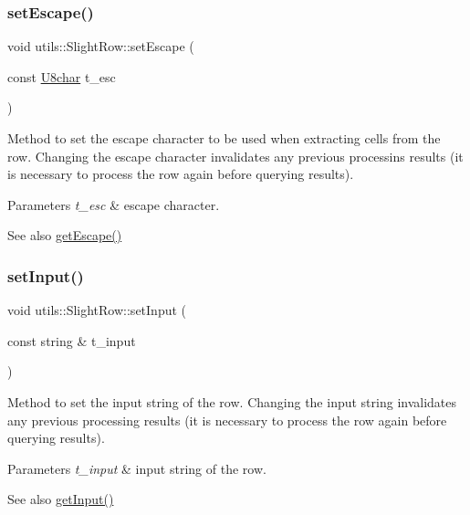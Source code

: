 \subsubsection{\texorpdfstring{set\+Escape()}{setEscape()}}
{\footnotesize\ttfamily void utils\+::\+Slight\+Row\+::set\+Escape (\begin{DoxyParamCaption}\item[{const \hyperlink{classutils_1_1U8char}{U8char}}]{t\+\_\+esc }\end{DoxyParamCaption})}

Method to set the escape character to be used when extracting cells from the row. Changing the escape character invalidates any previous processins results (it is necessary to process the row again before querying results). 
\begin{DoxyParams}{Parameters}
{\em t\+\_\+esc} & escape character. \\
\hline
\end{DoxyParams}
\begin{DoxySeeAlso}{See also}
\hyperlink{classutils_1_1SlightRow_a246b904bb9d00b2fa85d491be12d95e2}{get\+Escape()} 
\end{DoxySeeAlso}
\mbox{\label{classutils_1_1SlightRow_a6642e240662b1d078c9103f867f0adf9}} 
\subsubsection{\texorpdfstring{set\+Input()}{setInput()}}
{\footnotesize\ttfamily void utils\+::\+Slight\+Row\+::set\+Input (\begin{DoxyParamCaption}\item[{const string \&}]{t\+\_\+input }\end{DoxyParamCaption})}

Method to set the input string of the row. Changing the input string invalidates any previous processing results (it is necessary to process the row again before querying results). 
\begin{DoxyParams}{Parameters}
{\em t\+\_\+input} & input string of the row. \\
\hline
\end{DoxyParams}
\begin{DoxySeeAlso}{See also}
\hyperlink{classutils_1_1SlightRow_a8491ac21fba9e5c258e7c1a3bf3da26a}{get\+Input()} 
\end{DoxySeeAlso}
\mbox{\label{classutils_1_1SlightRow_a134dbf724d45204294e439733540ba4a}} 
